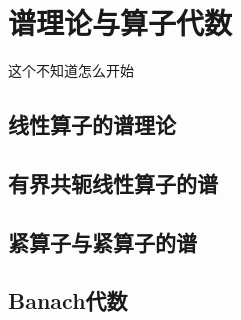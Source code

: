 \section{\deng 谱理论与算子代数}
这个不知道怎么开始
\subsection{\zhen 线性算子的谱理论}

\subsection{\zhen 有界共轭线性算子的谱}

\subsection{\zhen 紧算子与紧算子的谱}


\subsection{\zhen Banach代数}